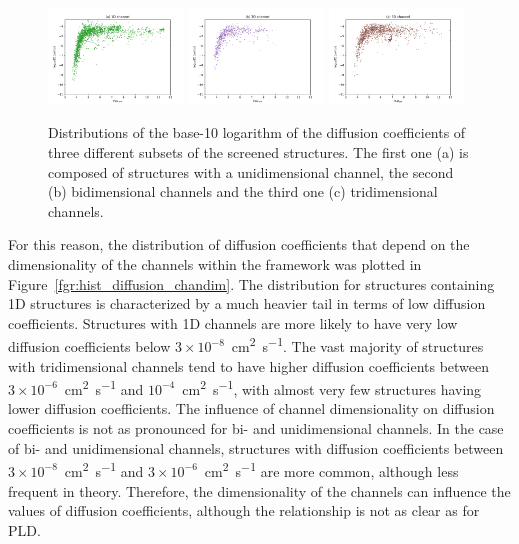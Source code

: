 \documentclass[main]{subfiles}
\begin{document}
\begin{figure}[ht]
  \centering
    \includegraphics[width=0.32\textwidth]{figures/5-diffusion/D_log-PLD_1D_chan.pdf}
    \includegraphics[width=0.32\textwidth]{figures/5-diffusion/D_log-PLD_2D_chan.pdf}
    \includegraphics[width=0.32\textwidth]{figures/5-diffusion/D_log-PLD_3D_chan.pdf}
    \caption{ Distributions of the base-10 logarithm of the diffusion coefficients of three different subsets of the screened structures. The first one (a) is composed of structures with a unidimensional channel, the second (b) bidimensional channels and the third one (c) tridimensional channels. }\label{fgr:scatter_diffusion_chandim}
\end{figure}

For this reason, the distribution of diffusion coefficients that depend on the dimensionality of the channels within the framework was plotted in Figure~\ref{fgr:hist_diffusion_chandim}. The distribution for structures containing 1D structures is characterized by a much heavier tail in terms of low diffusion coefficients. Structures with 1D channels are more likely to have very low diffusion coefficients below $3\times 10^{-8}$~\si{\square\cm\per\s}. The vast majority of structures with tridimensional channels tend to have higher diffusion coefficients between $3\times 10^{-6}$~\si{\square\cm\per\s} and $10^{-4}$~\si{\square\cm\per\s}, with almost very few structures having lower diffusion coefficients. The influence of channel dimensionality on diffusion coefficients is not as pronounced for bi- and unidimensional channels. In the case of bi- and unidimensional channels, structures with diffusion coefficients between $3\times 10^{-8}$~\si{\square\cm\per\s} and $3\times 10^{-6}$~\si{\square\cm\per\s} are more common, although less frequent in theory. Therefore, the dimensionality of the channels can influence the values of diffusion coefficients, although the relationship is not as clear as for PLD.
\end{document}
